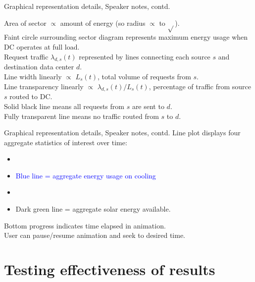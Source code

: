 \documentclass[xcolor=dvipsnames]{beamer}
\begin{document}
\begin{frame}{Graphical representation details, Speaker notes, contd.}

	Area of sector $\propto$ amount of energy (so radius $\propto$ to $\sqrt{}$). \\ 
	Faint circle surrounding sector diagram represents maximum energy usage when DC operates at full load. \\
	Request traffic $\lambda_{d,s}(t)$ represented by lines connecting each source $s$ and destination data center $d$. \\
	Line width linearly $\propto$ $L_s(t)$, total volume of requests from $s$. \\
	Line transparency linearly $\propto$ ${\lambda_{d,s}(t)} / {L_s(t)}$, percentage of traffic from source $s$ routed to DC.  \\
	Solid black line means all requests from $s$ are sent to $d$. \\
	Fully transparent line means no traffic routed from $s$ to $d$.
\end{frame}

\begin{frame}{Graphical representation details, Speaker notes, contd.}
	Line plot displays four aggregate statistics of interest over time: 
	\begin{itemize}
	\item{\textcolor{yellow}{}}
	\item{\textcolor{blue}{Blue line = aggregate energy usage on cooling}}
	\item{\textcolor{green}{}}
	\item{\textcolor{dgreen}{Dark green line = aggregate solar energy available}.}
	\end{itemize}
	Bottom progress indicates time elapsed in animation. \\
	User can pause/resume animation and seek to desired time.
\end{frame}


\section{Testing effectiveness of results}
\end{document}
